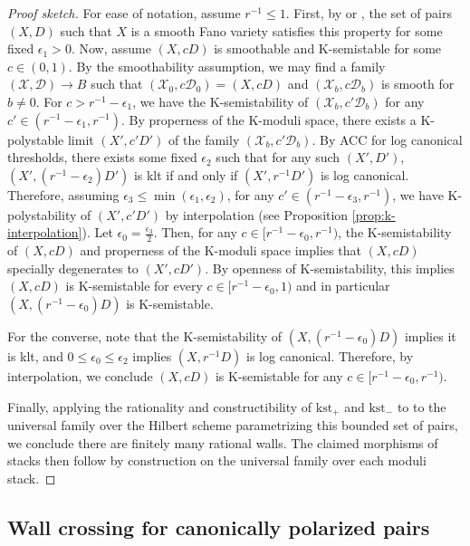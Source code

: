 \documentclass[11pt]{amsart}
\numberwithin{equation}{section}
\theoremstyle{definition}
\newcommand{\calX}{\mathcal{X}}
\newcommand{\calD}{\mathcal{D}}
\newcommand{\kst}{\mathrm{kst}}
\begin{document}
\begin{proof}[Proof sketch]
    For ease of notation, assume $r^{-1} \le 1$. First, by \cite[Lemma 3.4]{ADLpub} or \cite[Theorem 1.8]{LXZ}, the set of pairs $(X,D)$ such that $X$ is a smooth Fano variety satisfies this property for some fixed $\epsilon_1 > 0$.  Now, assume $(X, cD)$ is smoothable and K-semistable for some $c \in (0,1)$.  By the smoothability assumption, we may find a family $(\calX, \calD) \to B$ such that $(\calX_0, c\calD_0) = (X, cD)$ and $(\calX_b, c\calD_b)$ is smooth for $b \ne 0$.  For $c > r^{-1} - \epsilon_1$, we have the K-semistability of $(\calX_b, c' \calD_b)$  for any $c' \in (r^{-1} - \epsilon_1, r^{-1})$.  By properness of the K-moduli space, there exists a K-polystable limit $(X', c'D')$ of the family $(\calX_b, c' \calD_b)$. By ACC for log canonical thresholds, there exists some fixed $\epsilon_2$ such that for any such $(X',D')$, $(X',(r^{-1} - \epsilon_2)D')$ is klt if and only if $(X',r^{-1}D')$ is log canonical.  Therefore, assuming $\epsilon_3 \le \min(\epsilon_1, \epsilon_2)$, for any $c' \in (r^{-1} - \epsilon_3, r^{-1})$, we have K-polystability of $(X',c'D')$ by interpolation (see Proposition \ref{prop:k-interpolation}).  Let $\epsilon_0 = \frac{\epsilon_3}{2}$.  Then, for any $c \in [r^{-1} - \epsilon_0, r^{-1})$, the K-semistability of $(X,cD)$ and properness of the K-moduli space implies that $(X,cD)$ specially degenerates to $(X',cD')$.  By openness of K-semistability, this implies $(X,cD)$ is K-semistable for every $c \in [r^{-1} - \epsilon_0, 1)$ and in particular $(X,(r^{-1} - \epsilon_0)D)$ is K-semistable.  
    
    For the converse, note that the K-semistability of $(X,(r^{-1} - \epsilon_0)D)$ implies it is klt, and $0 \le \epsilon_0 \le \epsilon_2$ implies $(X, r^{-1} D)$ is log canonical.  Therefore, by interpolation, we conclude $(X,cD)$ is K-semistable for any $c \in[r^{-1}-\epsilon_0, r^{-1})$.

    Finally, applying the rationality and constructibility of $\kst_+$ and $\kst_-$ to to the universal family over the Hilbert scheme parametrizing this bounded set of pairs, we conclude there are finitely many rational walls.  The claimed morphisms of stacks then follow by construction on the universal family over each moduli stack. 
\end{proof}

\subsection{Wall crossing for canonically polarized pairs}
\end{document}
